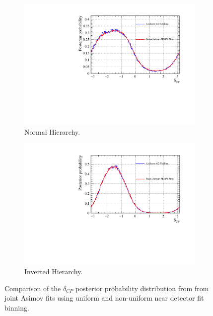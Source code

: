 \begin{figure}[!htbp]
\centering
\begin{subfigure}{.7\textwidth}
  \centering
  \includegraphics[width=0.95\linewidth]{figs/compMaCh3Contours_TH2DvsTHPoly_asimov/compMaCh3Contours_TH2DvsTHPoly_dcp_asimovA_NH}
  \caption{Normal Hierarchy.}
  \label{fig:TH2DPolydcpNH}
\end{subfigure}
\begin{subfigure}{.7\textwidth}
  \centering
  \includegraphics[width=0.95\linewidth]{figs/compMaCh3Contours_TH2DvsTHPoly_asimov/compMaCh3Contours_TH2DvsTHPoly_dcp_asimovA_IH}
  \caption{Inverted Hierarchy.}
  \label{fig:TH2DPolydcpIH}
\end{subfigure}
\caption{Comparison of the $\delta_{CP}$ posterior probability distribution from from joint Asimov fits using uniform and non-uniform near detector fit binning.}
\label{fig:TH2DPolydcp}
\end{figure}

